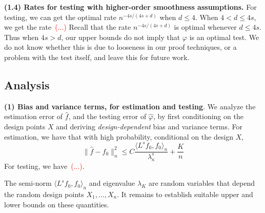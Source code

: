 \documentclass{article}
\newcommand{\1}{\mathbf{1}}
\newcommand{\dotp}[2]{\langle #1, #2 \rangle}
\newcommand{\wh}[1]{\widehat{#1}}
\theoremstyle{alden}
\theoremstyle{aldenthm}
\theoremstyle{definition}
\theoremstyle{remark}
\begin{document}
\textbf{(1.4) Rates for testing with higher-order smoothness assumptions.} For testing, we can get the optimal rate $n^{-4s/(4s + d)}$ when $d \leq 4$. When $4 < d \leq 4s$, we get the rate~\textcolor{red}{(...)} Recall that the rate $n^{-4s/(4s + d)}$ is optimal whenever $d \leq 4s$. Thus when $4s > d$, our upper bounds do not imply that $\varphi$ is an optimal test. We do not know whether this is due to looseness in our proof techniques, or a problem with the test itself, and leave this for future work.

\subsection{Analysis}
\label{subsec:analysis}

\textbf{(1) Bias and variance terms, for estimation and testing}. We analyze the estimation error of $\wh{f}$, and the testing error of $\wh{\varphi}$, by first conditioning on the design points $X$ and deriving \emph{design-dependent} bias and variance terms. For estimation, we have that with high probability, conditional on the design $X$,
\begin{equation*}
\|\wh{f} - f_0\|_n^2 \leq C\frac{\dotp{L^s f_0}{f_0}_n}{\lambda_{\kappa}^s} + \frac{K}{n}
\end{equation*}
For testing, we have~\textcolor{red}{(...)}.

The semi-norm $\dotp{L^s f_0}{f_0}_n$ and eigenvalue $\lambda_{K}$ are random variables that depend the random design points $X_1,\ldots,X_n$. It remains to establish suitable upper and lower bounds on these quantities. 
\end{document}
